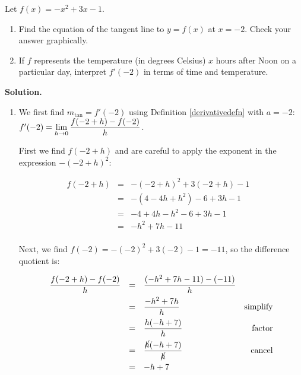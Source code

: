 \documentclass{ximera}
\begin{document}
\begin{ex}  \label{tangentlineex}  Let $f(x) = -x^2 + 3x-1$.  

\begin{enumerate}

\item Find the equation of the tangent line to $y = f(x)$ at $x = -2$.  Check your answer graphically.

\item  If $f$ represents the temperature (in degrees Celsius) $x$ hours after Noon on a particular day, interpret $f'(-2)$ in terms of time and temperature.

\end{enumerate}

\bigskip

{\bf Solution.}  \begin{enumerate} \item We first find $m_{\text{tan}} = f'(-2)$ using Definition \ref{derivativedefn} with $a = -2$:  $ f'(-2) = \ds{\lim_{h \rightarrow 0} \dfrac{f(-2+h) - f(-2)}{h}}$. 

First we find $f(-2+h)$ and are  careful to apply the exponent in the expression $-(-2+h)^2$:

\[ \begin{array}{rclr}  
  f(-2+h) & = & -(-2+h)^2 +3(-2+h) -1 & \\ 
  & = & - (4 - 4h+h^2) -6+3h-1 & \\
 & = & -4 + 4h-h^2-6+3h-1& \\
  & = & -h^2+7h-11& \\
 \end{array} \]

Next, we find $f(-2) = -(-2)^2 + 3(-2)-1 = -11$, so the difference quotient is:

\[ \begin{array}{rclr}

\dfrac{f(-2+h)-f(-2)}{h} & = & \dfrac{(-h^2+7h-11) -(-11)}{h} & \\[8pt]
                                & = & \dfrac{-h^2+7h}{h} & \text{simplify}\\[8pt]
                                & = &  \dfrac{h(-h+7)}{h} & \text{factor} \\[8pt]
                                & = &  \dfrac{\cancel{h}(-h+7)}{\cancel{h}} &  \text{cancel} \\[8pt]
                                & = & -h+7\\ \end{array} \]




\end{enumerate}
\end{ex}
\end{document}
